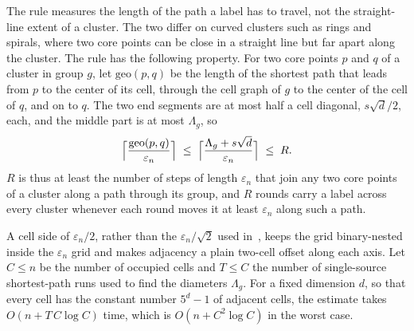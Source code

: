 The rule measures the length of the path a label has to travel, not the
straight-line extent of a cluster. The two differ on curved clusters
such as rings and spirals, where two core points can be close in a
straight line but far apart along the cluster. The rule has the
following property. For two core points $p$ and $q$ of a cluster in
group $g$, let $\mathrm{geo}(p,q)$ be the length of the shortest path
that leads from $p$ to the center of its cell, through the cell graph of
$g$ to the center of the cell of $q$, and on to $q$. The two end
segments are at most half a cell diagonal, $s\sqrt{d}/2$, each, and the
middle part is at most $\Lambda_g$, so
\[
  \Bigl\lceil \frac{\mathrm{geo}(p,q)}{\varepsilon_n} \Bigr\rceil
  \;\le\; \Bigl\lceil \frac{\Lambda_g + s\sqrt{d}}{\varepsilon_n}
  \Bigr\rceil \;\le\; R .
\]
$R$ is thus at least the number of steps of length $\varepsilon_n$ that
join any two core points of a cluster along a path through its group,
and $R$ rounds carry a label across every cluster whenever each round
moves it at least $\varepsilon_n$ along such a path.

A cell side of $\varepsilon_n/2$, rather than the
$\varepsilon_n/\sqrt{2}$ used in~\cite{fu2024ppa}, keeps the grid
binary-nested inside the $\varepsilon_n$ grid and makes adjacency a
plain two-cell offset along each axis. Let $C \le n$ be the number of
occupied cells and $T \le C$ the number of single-source shortest-path
runs used to find the diameters $\Lambda_g$. For a fixed dimension $d$,
so that every cell has the constant number $5^d - 1$ of adjacent cells,
the estimate takes $O(n + T\,C \log C)$ time, which is
$O(n + C^2 \log C)$ in the worst case.